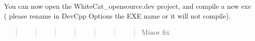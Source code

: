 You can now open the White\-Cat\-\_\-opensource.\-dev project, and compile a new exe ( please rename in Dev\-Cpp Options the E\-X\-E name or it will not compile). \begin{quotation}
\begin{quotation}
\begin{quotation}
\begin{quotation}
\begin{quotation}
\begin{quotation}
\begin{quotation}
Minor fix \end{quotation}


\end{quotation}


\end{quotation}


\end{quotation}


\end{quotation}


\end{quotation}


\end{quotation}
